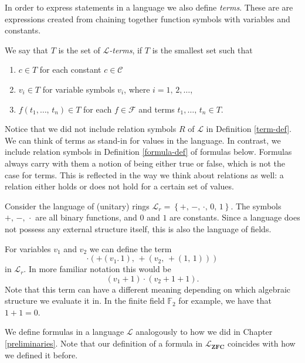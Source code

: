 \documentclass[../../main.tex]{subfiles}
\begin{document}
In order to express statements in a language we also define \textit{terms}.
These are are expressions created from chaining together function symbols with variables and constants.

\begin{definition}\label{term-def}\cite[Definition 1.1.4]{Mar02}
    We say that $T$ is the set of \emph{$\mathcal{L}$-terms}, if $T$ is the smallest set such that
    \begin{enumerate}[label=(\roman*)]
        \item $c \in T$ for each constant $c \in \mathcal{C}$
        \item $v_i \in T$ for variable symbols $v_i$, where $i = 1,\, 2,\ldots$,
        \item $f(t_1,\ldots,\, t_n) \in T$ for each $f \in \mathcal{F}$ and terms $t_1,\ldots,\, t_n \in T$.
    \end{enumerate}
\end{definition}

Notice that we did not include relation symbols $R$ of $\mathcal{L}$ in Definition \ref{term-def}.
We can think of terms as stand-in for values in the language.
In contrast, we include relation symbols in Definition \ref{formula-def} of formulas below.
Formulas always carry with them a notion of being either true or false, which is not the case for terms.
This is reflected in the way we think about relations as well: a relation either holds or does not hold for a certain set of values.

\begin{example}
    Consider the language of (unitary) rings $\mathcal{L}_r = \left\{+,\, -,\, \cdot,\, 0,\, 1\right\}$.
    The symbols $+,\, -,\, \cdot$ are all binary functions, and $0$ and $1$ are constants.
    Since a language does not possess any external structure itself, this is also the language of fields.

    For variables $v_1$ and $v_2$ we can define the term
    $$\cdot \left(+ \left(v_1.\, 1\right),\, +\left(v_2,\, +\left(1,\, 1\right)\right)\right)$$
    in $\mathcal{L}_r$.
    In more familiar notation this would be
    $$\left(v_1 + 1\right) \cdot \left(v_2 + 1 + 1\right).$$
    Note that this term can have a different meaning depending on which algebraic structure we evaluate it in.
    In the finite field $\mathbb{F}_2$ for example, we have that $1 + 1 = 0$.
\end{example}

We define formulas in a language $\mathcal{L}$ analogously to how we did in Chapter \ref{preliminaries}.
Note that our definition of a formula in $\mathcal{L}_{\textbf{ZFC}}$ coincides with how we defined it before.
\end{document}
